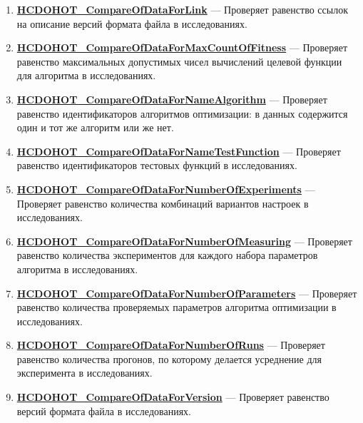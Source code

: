 \documentclass[a4paper,12pt]{article}
\begin{document}
\begin{enumerate}
	\item \textbf{\hyperref[HCDOHOT_CompareOfDataForLink]{HCDOHOT\_CompareOfDataForLink}} --- Проверяет равенство ссылок на описание версий формата файла в исследованиях.
	
	\item \textbf{\hyperref[HCDOHOT_CompareOfDataForMaxCountOfFitness]{HCDOHOT\_CompareOfDataForMaxCountOfFitness}} --- Проверяет равенство максимальных допустимых чисел вычислений целевой функции для алгоритма в исследованиях.
	
	\item \textbf{\hyperref[HCDOHOT_CompareOfDataForNameAlgorithm]{HCDOHOT\_CompareOfDataForNameAlgorithm}} --- Проверяет равенство идентификаторов алгоритмов оптимизации: в данных содержится один и тот же алгоритм или же нет.
	
	\item \textbf{\hyperref[HCDOHOT_CompareOfDataForNameTestFunction]{HCDOHOT\_CompareOfDataForNameTestFunction}} --- Проверяет равенство идентификаторов тестовых функций в исследованиях.
	
	\item \textbf{\hyperref[HCDOHOT_CompareOfDataForNumberOfExperiments]{HCDOHOT\_CompareOfDataForNumberOfExperiments}} --- Проверяет равенство количества комбинаций вариантов настроек в исследованиях.
	
	\item \textbf{\hyperref[HCDOHOT_CompareOfDataForNumberOfMeasuring]{HCDOHOT\_CompareOfDataForNumberOfMeasuring}} --- Проверяет равенство количества экспериментов для каждого набора параметров алгоритма в исследованиях.
	
	\item \textbf{\hyperref[HCDOHOT_CompareOfDataForNumberOfParameters]{HCDOHOT\_CompareOfDataForNumberOfParameters}} --- Проверяет равенство количества проверяемых параметров алгоритма оптимизации в исследованиях.
	
	\item \textbf{\hyperref[HCDOHOT_CompareOfDataForNumberOfRuns]{HCDOHOT\_CompareOfDataForNumberOfRuns}} --- Проверяет равенство количества прогонов, по которому делается усреднение для эксперимента в исследованиях.
	
	\item \textbf{\hyperref[HCDOHOT_CompareOfDataForVersion]{HCDOHOT\_CompareOfDataForVersion}} --- Проверяет равенство версий формата файла в исследованиях.
	
\end{enumerate}
\end{document}
